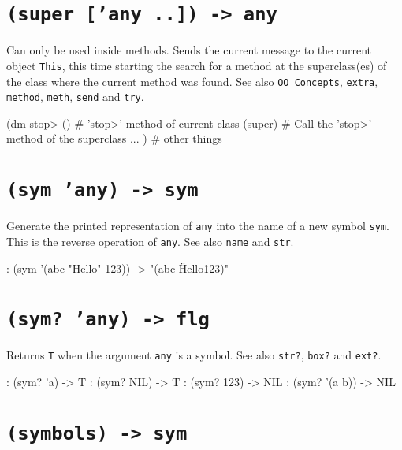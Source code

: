  
\section*{\texttt{(super ['any ..]) -> any}}
\label{sec:func-ref-S-(super ['any ..]) -> any}


Can only be used inside methods. Sends the current message to the
current object \texttt{This}, this time starting the search for a method at the
superclass(es) of the class where the current method was found. See also
\texttt{OO Concepts}, \texttt{extra}, \texttt{method}, \texttt{meth}, \texttt{send} and \texttt{try}.


\begin{wideverbatim}
(dm stop> ()         # 'stop>' method of current class
   (super)           # Call the 'stop>' method of the superclass
   ... )             # other things
\end{wideverbatim}

 
\section*{\texttt{(sym 'any) -> sym}}
\label{sec:func-ref-S-(sym 'any) -> sym}


Generate the printed representation of \texttt{any} into the name of a new
symbol \texttt{sym}. This is the reverse operation of \texttt{any}. See also \texttt{name}
and \texttt{str}.


\begin{wideverbatim}
: (sym '(abc "Hello" 123))
-> "(abc \"Hello\" 123)"
\end{wideverbatim}

 
\section*{\texttt{(sym? 'any) -> flg}}
\label{sec:func-ref-S-(sym? 'any) -> flg}


Returns \texttt{T} when the argument \texttt{any} is a symbol. See also \texttt{str?}, \texttt{box?}
and \texttt{ext?}.


\begin{wideverbatim}
: (sym? 'a)
-> T
: (sym? NIL)
-> T
: (sym? 123)
-> NIL
: (sym? '(a b))
-> NIL
\end{wideverbatim}

 
\section*{\texttt{(symbols) -> sym}}
\label{sec:func-ref-S-(symbols) -> sym}


